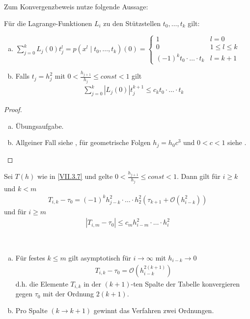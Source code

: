 Zum Konvergenzbeweis nutze folgende Aussage:

\begin{Leme}\label{7.3.8}
  Für die Lagrange-Funktionen $L_i$ 
  zu den Stützstellen $t_0,\ldots, t_k$ gilt:
  \begin{enumerate}[a)]
  \item $\sum_{j=0}^kL_j(0)t_j^l=p(x^l\mid t_0,\ldots,t_k)(0)
    =\begin{cases}
      1 &l=0\\
      0&1\leq l\leq k\\
      (-1)^kt_0\cdot\ldots\cdot t_k & l=k+1
    \end{cases}$
  \item Falls $t_j=h_j^2$ mit $0<\frac{h_{j+1}}{h_j}\leq const<1$ gilt
    \begin{gather*}
      \sum_{j=0}^k\left|L_j(0)\right|t_j^{k+1}\leq
      c_kt_0\cdot\ldots\cdot t_k
    \end{gather*}
  \end{enumerate}
  \begin{proof}~
    \begin{enumerate}[a)]
    \item Übungsaufgabe.
    \item Allgeiner Fall siehe \cite{stoerbulirsch},
      für geometrische Folgen $h_j=h_0c^3$ und $0<c<1$ siehe
      \cite{stoer}. 
    \end{enumerate}
  \end{proof}
\end{Leme}

\begin{Satze}\label{7.3.9}
  Sei $T(h)$ wie in \eqref{VII.3.7}
  und gelte $0<\frac{h_{j+1}}{h_j}\leq const<1$.
  Dann gilt für $i\geq k$ und $k<m$
  \begin{gather}
    T_{i,k}-\tau_0=(-1)^kh_{j-k}^2\cdot\ldots
    \cdot h_2^2\left(\tau_{k+1}+\mathcal{O}(h_{i-k}^2)\right)
    \label{VII.3.11}
  \end{gather}
  und für $i\geq m$
  \begin{gather}
    \left| T_{i,m}-\tau_0 \right| \leq c_mh_{i-m}^2\cdot\ldots \cdot h_i^2
    \label{VII.3.12}
  \end{gather}
\end{Satze}

\begin{Kore}~
  \begin{enumerate}[a)]
  \item Für festes $k\leq m $ gilt asymptotisch 
    für $i\longrightarrow \infty$ mit $h_{i-k}\longrightarrow 0$
    \begin{gather}
      T_{i,k}-\tau_0 = \mathcal{O}\left(h_{i-k}^{2(k+1)}\right)
      \label{VII.3.13}
    \end{gather}
    d.h. die Elemente $T_{i,k}$ in der $(k+1)$-ten Spalte der Tabelle
    konvergieren gegen $\tau_0$ mit der Ordnung $2(k+1)$.
  \item Pro Spalte $(k \rightarrow k+1)$ 
    gewinnt das Verfahren zwei Ordnungen.
  \end{enumerate}

\end{Kore}

